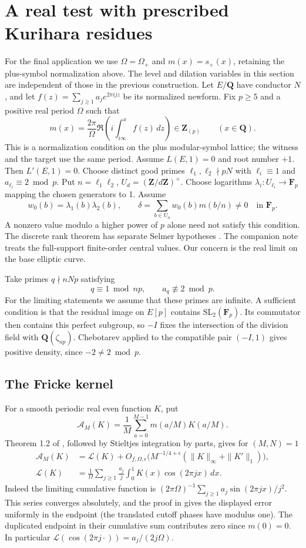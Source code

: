 \documentclass[11pt]{article}
\newcommand{\Q}{\mathbf Q}\newcommand{\R}{\mathbf R}\newcommand{\Z}{\mathbf Z}
\newcommand{\FF}{\mathbf F}\newcommand{\A}{\mathcal A}\newcommand{\Lfun}{\mathcal L}
\begin{document}
\section{A real test with prescribed Kurihara residues}
For the final application we use $\Omega=\Omega_+$ and $m(x)=s_+(x)$, retaining the plus-symbol normalization above. The level and dilation variables in this section are independent of those in the previous construction.
Let $E/\Q$ have conductor $N$, and let $f(z)=\sum_{j\ge1}a_j e^{2\pi i jz}$ be its normalized newform. Fix $p\ge5$ and a positive real period $\Omega$ such that
\[
 m(x)=\frac{2\pi}{\Omega}\Re\left(i\int_{i\infty}^{x} f(z)\,dz\right)\in\Z_{(p)}
 \qquad(x\in\Q).
\]
This is a normalization condition on the plus modular-symbol lattice; the witness and the target use the same period. Assume $L(E,1)=0$ and root number $+1$. Then $L'(E,1)=0$. Choose distinct good primes $\ell_1,\ell_2\nmid pN$ with $\ell_i\equiv1$ and $a_{\ell_i}\equiv2\bmod p$. Put $n=\ell_1\ell_2$, $U_d=(\Z/d\Z)^\times$. Choose logarithms $\lambda_i:U_{\ell_i}\to\FF_p$ mapping the chosen generators to 1. Assume
\[
 w_0(b)=\lambda_1(b)\lambda_2(b),\qquad
 \delta=\sum_{b\in U_n}w_0(b)m(b/n)\ne0\quad\text{in }\FF_p.
\]
A nonzero value modulo a higher power of $p$ alone need not satisfy this condition. The discrete rank theorem has separate Selmer hypotheses \cite{Kim}. The companion note \cite{previous} treats the full-support finite-order central values. Our concern is the real limit on the base elliptic curve.

Take primes $q\nmid nNp$ satisfying
\begin{equation}\label{qcond}
 q\equiv1\bmod np,\qquad a_q\not\equiv2\bmod p .
\end{equation}
For the limiting statements we assume that these primes are infinite. A sufficient condition is that the residual image on $E[p]$ contains $\mathrm{SL}_2(\FF_p)$. Its commutator then contains this perfect subgroup, so $-I$ fixes the intersection of the division field with $\Q(\zeta_{np})$. Chebotarev applied to the compatible pair $(-I,1)$ gives positive density, since $-2\ne2\bmod p$.

\subsection{The Fricke kernel}
For a smooth periodic real even function $K$, put
\[
 \A_M(K)=\frac1M\sum_{a=0}^{M-1}m(a/M)K(a/M).
\]
Theorem 1.2 of \cite{DHKL}, followed by Stieltjes integration by parts, gives for $(M,N)=1$
\begin{align*}
 \A_M(K)&=\Lfun(K)+O_{f,\Omega,\epsilon}
       \big(M^{-1/4+\epsilon}(\|K\|_\infty+\|K'\|_1)\big),\\
 \Lfun(K)&=\frac1\Omega\sum_{j\ge1}\frac{a_j}{j}
       \int_0^1K(x)\cos(2\pi jx)\,dx .
\end{align*}
Indeed the limiting cumulative function is $(2\pi\Omega)^{-1}\sum_{j\ge1}a_j\sin(2\pi jx)/j^2$. This series converges absolutely, and the proof in \cite{DHKL} gives the displayed error uniformly in the endpoint (the translated cutoff phases have modulus one). The duplicated endpoint in their cumulative sum contributes zero since $m(0)=0$. In particular $\Lfun(\cos(2\pi j\cdot))=a_j/(2j\Omega)$.
\end{document}
